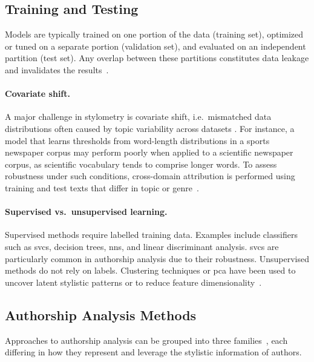 \subsection{Training and Testing}
\label{subsec:train_test}

Models are typically trained on one portion of the data (training set), optimized or tuned on a separate portion (validation set), and evaluated on an independent partition (test set). 
Any overlap between these partitions constitutes data leakage and invalidates the results~\citep{bischoff_importance_2020,altakrori_topic_2021,boenninghoff_o2d2_2021}. 

\paragraph{Covariate shift.} %
A major challenge in stylometry is covariate shift, i.e.\ mismatched data distributions often caused by topic variability across datasets \citep{boenninghoff_o2d2_2021}. 
For instance, a model that learns thresholds from word-length distributions in a sports newspaper corpus may perform poorly when applied to a scientific newspaper corpus, as scientific vocabulary tends to comprise longer words. 
To assess robustness under such conditions, cross-domain attribution is performed using training and test texts that differ in topic or genre~\citep{barlas_cross_domain_2020}.

\paragraph{Supervised vs.\ unsupervised learning.}  
Supervised methods require labelled training data. 
Examples include classifiers such as \acp{svc}, decision trees, \acp{nn}, and linear discriminant analysis. 
\acp{svc} are particularly common in authorship analysis due to their robustness. 
Unsupervised methods do not rely on labels.
Clustering techniques or \acl{pca} have been used to uncover latent stylistic patterns or to reduce feature dimensionality~\citep{abbasi_writeprints_2008}.


\subsection{Authorship Analysis Methods}
\label{subsec:attribution_methods}

Approaches to authorship analysis can be grouped into three families~\citep{stamatatos_survey_2009}, each differing in how they represent and leverage the stylistic information of authors.

